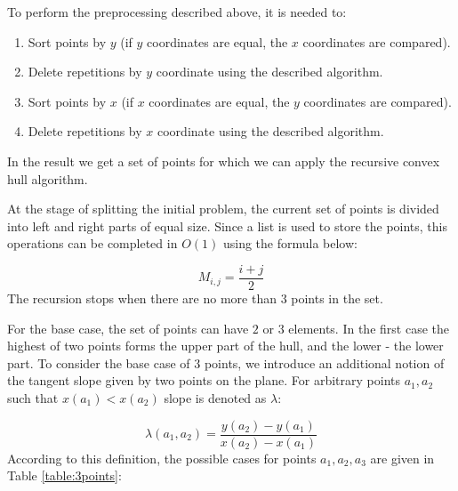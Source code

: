 \documentclass[conference]{IEEEtran}
\theoremstyle{plane}
\begin{document}
		To perform the preprocessing described above, it is needed to:
		
		\begin{enumerate}
			\item
			Sort points by $y$ (if $y$ coordinates are equal, the $x$ coordinates are compared).
			\item
			Delete repetitions by $y$ coordinate using the described algorithm.
			\item
			Sort points by $x$ (if $x$ coordinates are equal, the $y$ coordinates are compared).
			\item
			Delete repetitions by $x$ coordinate using the described algorithm.
		\end{enumerate}
	
		In the result we get a set of points for which we can apply the recursive convex hull algorithm.
		

		
		At the stage of splitting the initial problem, the current set of points is divided into left and right parts of equal size. Since a list is used to store the points, this operations can be completed in $O(1)$ using the formula below:
		
		\begin{equation}
			M_{i,j}=\frac{i+j}{2}
		\end{equation}
		The recursion stops when there are no more than $3$ points in the set.
		
		For the base case, the set of points can have $2$ or $3$ elements. In the first case the highest of two points forms the upper part of the hull, and the lower - the lower part.
		To consider the base case of $3$ points, we introduce an additional notion of the tangent slope given by two points on the plane. For arbitrary points $a_1, a_2$ such that $x(a_1)<x(a_2)$ slope is denoted as $\lambda$:
		
		\begin{equation}
			\lambda(a_1, a_2)=\frac{y(a_2)-y(a_1)}{x(a_2)-x(a_1)}
		\end{equation}
		According to this definition, the possible cases for points $a_1,a_2,a_3$ are given in Table \ref{table:3points}:
		
\end{document}
